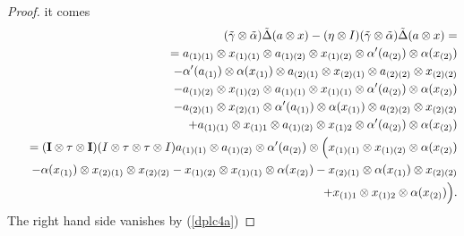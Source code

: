 \documentclass[10pt,a4paper]{amsart}
\begin{document}
\begin{proof}
it comes
\begin{eqnarray}
 &&\qquad(\tilde\gamma\otimes \tilde\alpha)\tilde\Delta(a\otimes x)-(\eta\otimes I)(\tilde\gamma\otimes \tilde\alpha)\tilde\Delta(a\otimes x)=\nonumber\\
&&=a_{(1)(1)}\otimes x_{(1)(1)}\otimes a_{(1)(2)}\otimes x_{(1)(2)}\otimes \alpha'(a_{(2)})\otimes \alpha(x_{(2)})\nonumber\\
&&\quad\quad-\alpha'(a_{(1)})\otimes \alpha(x_{(1)})\otimes a_{(2)(1)}\otimes x_{(2)(1)}\otimes a_{(2)(2)}\otimes x_{(2)(2)}\nonumber\\
&&\quad-a_{(1)(2)}\otimes x_{(1)(2)}\otimes a_{(1)(1)}\otimes x_{(1)(1)}\otimes \alpha'(a_{(2)})\otimes \alpha(x_{(2)})\nonumber\\
&&\quad\quad-a_{(2)(1)}\otimes x_{(2)(1)}\otimes \alpha'(a_{(1)})\otimes \alpha(x_{(1)})\otimes a_{(2)(2)}\otimes x_{(2)(2)}\nonumber\\
&&\quad+a_{(1)(1)}\otimes x_{(1)1}\otimes a_{(1)(2)}\otimes x_{(1)2}\otimes \alpha'(a_{(2)})\otimes \alpha(x_{(2)})\nonumber\\
&&=({\bf I}\otimes\tau\otimes {\bf I})(I\otimes\tau\otimes\tau\otimes I)a_{(1)(1)}\otimes a_{(1)(2)}\otimes \alpha'(a_{(2)})\otimes\Big( 
x_{(1)(1)}\otimes x_{(1)(2)}\otimes \alpha(x_{(2)})\nonumber\\
&&\quad-\alpha(x_{(1)})\otimes x_{(2)(1)}\otimes x_{(2)(2)}-x_{(1)(2)}\otimes x_{(1)(1)}\otimes \alpha(x_{(2)})
-x_{(2)(1)}\otimes \alpha(x_{(1)})\otimes x_{(2)(2)}\nonumber\\
&&\quad+x_{(1)1}\otimes x_{(1)2}\otimes \alpha(x_{(2)})\Big).\nonumber
\end{eqnarray}
The right hand side vanishes by (\ref{dplc4a})
\end{proof}
\end{document}
